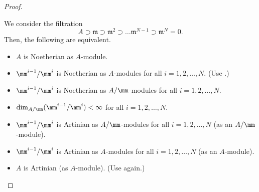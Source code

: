 \begin{proof}
\begin{enumerate}
    We consider the filtration
    $$A\supset \mathfrak m\supset \mathfrak m^2
    \supset \dots \mathfrak m^{N-1}\supset \mathfrak m^N=0.$$
    Then, the following are equivalent.
    \begin{itemize}
    \item $A$ is Noetherian as $A$-module.
    \item $\mm^{i-1}/\mm^i$ is Noetherian as $A$-modules for all $i=1,2,\dots,N$. (Use .)
    \item $\mm^{i-1}/\mm^i$ is Noetherian as $A/\mm$-modules for all $i=1,2,\dots,N$.
    \item $\dim_{A/\mm}(\mm^{i-1}/\mm^i) < \infty$
    for all $i=1,2,\dots,N$.
    \item $\mm^{i-1}/\mm^i$ is Artinian as $A/\mm$-modules
    for all $i=1,2,\dots,N$
    (as an $A/\mm$-module).
    \item $\mm^{i-1}/\mm^i$ is Artinian as $A$-modules for all $i=1,2,\dots,N$
    (as an $A$-module).
    \item $A$ is Artinian (as $A$-module). 
    (Use  again.) \qedhere
    \end{itemize}
    \end{enumerate}
\end{proof}

